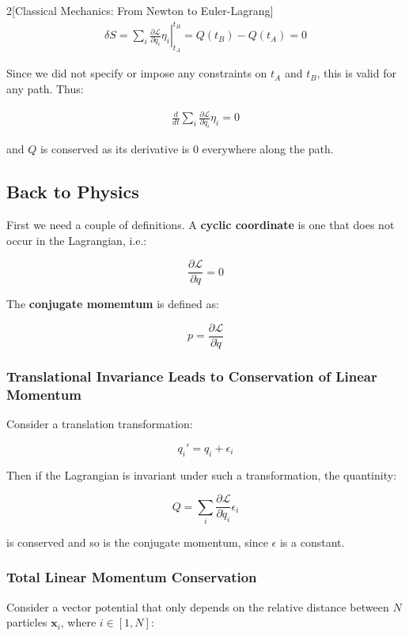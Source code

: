 \documentclass{article}
\begin{document}
\begin{multicols}{2}[Classical Mechanics: From Newton to Euler-Lagrang]
\begin{align*}
    \delta S = \sum_i \left. \frac{\partial \mathcal{L}}{\partial \dot{q}_i} \eta_i \right\vert_{t_A}^{t_B} = Q(t_B) - Q(t_A) = 0
\end{align*}

Since we did not specify or impose any constraints on $t_A$ and $t_B$, this is valid for any path. Thus:

\begin{align*}
    \frac{d}{dt} \sum_i \frac{\partial \mathcal{L}}{\partial \dot{q}_i} \eta_i = 0
\end{align*}

and $Q$ is conserved as its derivative is $0$ everywhere along the path.


\subsection{Back to Physics}
First we need a couple of definitions. A \textbf{cyclic coordinate} is one that does not occur in the Lagrangian, i.e.:

\begin{equation}
    \frac{\partial \mathcal{L}}{\partial q} = 0
\end{equation}

The \textbf{conjugate momemtum} is defined as:

\begin{equation}
    p = \frac{\partial \mathcal{L}}{\partial \dot{q}}
\end{equation}


\subsubsection{Translational Invariance Leads to Conservation of Linear Momentum}
Consider a translation transformation:

\begin{equation*}
    q_i' = q_i + \epsilon_i
\end{equation*}

Then if the Lagrangian is invariant under such a transformation, the quantinity:

\begin{equation*}
    Q = \sum_i \frac{\partial \mathcal{L}}{\partial \dot{q}_i} \epsilon_i
\end{equation*}

is conserved and so is the conjugate momentum, since $\epsilon$ is a constant.

\subsubsection{Total Linear Momentum Conservation}
Consider a vector potential that only depends on the relative distance between $N$ particles $\bm{x}_i$, where $i \in [1, N]$:


\end{multicols}
\end{document}
